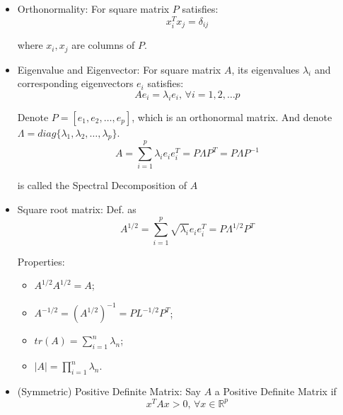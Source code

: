     \begin{itemize}[topsep=6pt,itemsep=4pt]
        \item Orthonormality: For square matrix $ P $ satisfies:
        \begin{equation}
            x_i^Tx_j=\delta _{ij} 
        \end{equation}

        where $ x_i,x_j $ are columns of $ P $.
        \item Eigenvalue and Eigenvector: For square matrix $ A $, its eigenvalues $ \lambda_i $ and corresponding eigenvectors $ e_i $ satisfies:
        \begin{equation}
            Ae_i=\lambda_ie_i,\,\forall i=1,2,\ldots p 
        \end{equation}

        Denote $ P=[e_1,e_2,\ldots ,e_p] $, which is an orthonormal matrix. And denote $ \Lambda =diag\{\lambda _1,\lambda _2,\ldots,\lambda _p\} $.
        \begin{equation}
            A=\sum_{i=1}^p\lambda _ie_ie_i^T=P \Lambda P^T=P\Lambda P^{-1}
        \end{equation}

        is called the Spectral Decomposition of $ A $

        
        
        \item Square root matrix: Def. as
        \begin{equation}
            A^{1/2}=\sum_{i=1}^p\sqrt{\lambda _i}e_ie_i^T=P\Lambda ^{1/2}P^T 
        \end{equation}

        Properties:
        \begin{itemize}[topsep=0pt,itemsep=-2pt]
            \item $ {\displaystyle A^{1/2}A^{1/2}=A} $;
            \item $ {\displaystyle A^{-1/2}=(A^{1/2})^{-1}=PL^{-1/2}}P^T $;
            \item $ tr(A) =\sum_{i=1}^n\lambda _n$;
            \item $ |A|=\prod_{i=1}^n\lambda _n $.
        \end{itemize}
        
            
        \item (Symmetric) Positive Definite Matrix: Say $ A $ a Positive Definite Matrix if
        \begin{equation}
            x^TAx> 0,\,\forall x\in\mathbb{R}^p 
        \end{equation}


\end{itemize}

